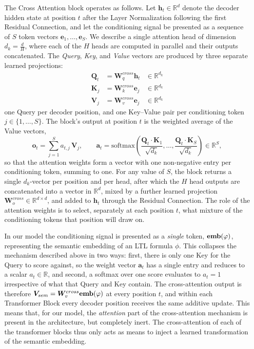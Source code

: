 \documentclass[titlepage,a4paper,11pt]{report}
\begin{document}
    The Cross Attention block operates as follows. Let $\bm{h}_t \in \mathbb{R}^d$ denote the decoder hidden state at position $t$ after the Layer Normalization following the first Residual Connection, and let the conditioning signal be presented as a sequence of $S$ token vectors $\bm{e}_1, \dots, \bm{e}_S$. We describe a single attention head of dimension $d_k = \frac{d}{H}$, where each of the $H$ heads are computed in parallel and their outputs concatenated. The \emph{Query}, \emph{Key}, and \emph{Value} vectors are produced by three separate learned projections:
    \begin{align}
        \bm{Q}_t &= \bm{W}^{cross}_q \bm{h}_t & \in \mathbb{R}^{d_k}\\
        \bm{K}_j &= \bm{W}^{cross}_k \bm{e}_j & \in \mathbb{R}^{d_k}\\
        \bm{V}_j &= \bm{W}^{cross}_v \bm{e}_j & \in \mathbb{R}^{d_k}
    \end{align}
    one Query per decoder position, and one Key--Value pair per conditioning token $j \in \{1, \dots, S\}$. The block's output at position $t$ is the weighted average of the Value vectors,
    \begin{equation}
        \bm{o}_t = \sum_{j=1}^{S} a_{t,j}\, \bm{V}_j,
        \qquad
        \bm{a}_t = \mathrm{softmax}\!\left(\frac{\bm{Q}_t \cdot \bm{K}_1}{\sqrt{d_k}}, \dots, \frac{\bm{Q}_t \cdot \bm{K}_S}{\sqrt{d_k}}\right) \in \mathbb{R}^{S},
    \end{equation}
    so that the attention weights form a vector with one non-negative entry per conditioning token, summing to one. For any value of $S$, the block returns a single $d_k$-vector per position and per head, after which the $H$ head outputs are concatenated into a vector in $\mathbb{R}^{d}$, mixed by a further learned projection $\bm{W}^{cross}_o \in \mathbb{R}^{d \times d}$, and added to $\bm{h}_t$ through the Residual Connection. The role of the attention weights is to select, separately at each position $t$, what mixture of the conditioning tokens that position will draw on.

    In our model the conditioning signal is presented as a \emph{single} token, $\textbf{emb}(\varphi)$, representing the semantic embedding of an LTL formula $\phi$. This collapses the mechanism described above in two ways: first, there is only one Key for the Query to score against, so the weight vector $\bm{a}_t$ has a single entry and reduces to a scalar $a_t \in \mathbb{R}$, and second, a softmax over one score evaluates to $a_t = 1$ irrespective of what that Query and Key contain. The cross-attention output is therefore $\bm{V}_{sem} = \bm{W}^{cross}_v \textbf{emb}(\varphi)$ at every position $t$, and within each Transformer Block every decoder position receives the same additive update. This means that, for our model, the \textit{attention} part of the cross-attention mechanism is present in the architecture, but completely inert. The cross-attention of each of the transformer blocks thus only acts as means to inject a learned transformation of the semantic embedding.
    
\end{document}
